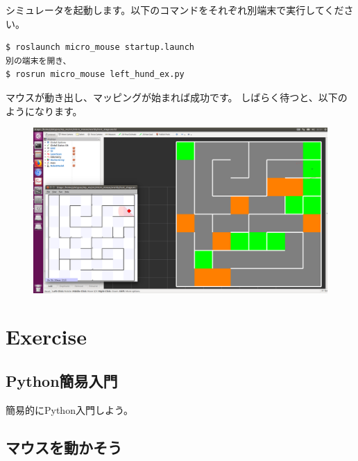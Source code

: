 \documentclass[11pt,a4paper]{jsarticle}
\begin{document}
シミュレータを起動します。以下のコマンドをそれぞれ別端末で実行してください。
\begin{lstlisting}[frame=single, caption=roscd, label=roscd]
$ roslaunch micro_mouse startup.launch
別の端末を開き、
$ rosrun micro_mouse left_hund_ex.py
\end{lstlisting}


マウスが動き出し、マッピングが始まれば成功です。
しばらく待つと、以下のようになります。
\begin{figure}[h]
  \begin{center}
    \includegraphics[width=128mm]{./mms_test.png}
  \end{center}
\end{figure}




\section{Exercise}
\subsection{Python簡易入門}
簡易的にPython入門しよう。

\newpage
\subsection{マウスを動かそう}




\newpage



\newpage

\end{document}
